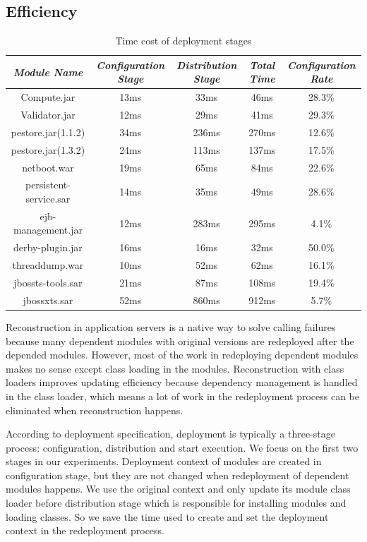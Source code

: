 \documentclass[conference]{IEEEtran}
\begin{document}
\subsection{Efficiency}


\begin{table}
\centering
\caption{Time cost of deployment stages}
\label{tab:stage}
\begin{tabular}{|c|c|c|c|c|}
\hline
\emph{Module Name}	&	\emph{Configuration Stage}	&	\emph{Distribution Stage}	&	\emph{Total Time}	&	\emph{Configuration Rate}\\
\hline
\hline
Compute.jar		&	13ms			&	33ms			&	46ms			&	28.3\%\\
\hline
Validator.jar		&	12ms			&	29ms			&	41ms			&	29.3\%\\
\hline
pestore.jar(1.1.2)	&	34ms			&	236ms			&	270ms			&	12.6\%\\
\hline
pestore.jar(1.3.2)	&	24ms			&	113ms			&	137ms			&	17.5\%\\
\hline
netboot.war		&	19ms		 	&	65ms			&	84ms			&	22.6\%\\
\hline
persistent-service.sar 	& 	14ms 			&	35ms			&	49ms			&	28.6\%\\
\hline
ejb-management.jar	& 	12ms		 	&	283ms			&	295ms			&	4.1\%\\
\hline
derby-plugin.jar	&	16ms			&	16ms			&	32ms			&	50.0\%\\
\hline
threaddump.war		&	10ms			&	52ms			&	62ms			&	16.1\%\\
\hline
jbossts-tools.sar	&	21ms			&	87ms			&	108ms			&	19.4\%\\
\hline
jbossxts.sar		&	52ms			&	860ms			&	912ms			&	5.7\%\\
\hline
\end{tabular}
\end{table}


Reconstruction in application servers is a native way to solve calling failures because many dependent modules with original versions are redeployed after the depended modules.
However, most of the work in redeploying dependent modules makes no sense except class loading in the modules.
Reconstruction with class loaders improves updating efficiency because dependency management is handled in the class loader, which means a lot of work in the redeployment process can be eliminated when reconstruction happens.

According to deployment specification\cite{jsr88}, deployment is typically a three-stage process: configuration, distribution and start execution.
We focus on the first two stages in our experiments.
Deployment context of modules are created in configuration stage, but they are not changed when redeployment of dependent modules happens.
We use the original context and only update its module class loader before distribution stage which is responsible for installing modules and loading classes.
So we save the time used to create and set the deployment context in the redeployment process.
\end{document}
